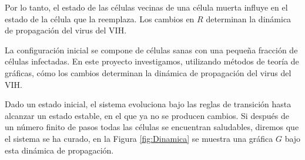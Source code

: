 \documentclass[12pt,titlepage,twoside,openright]{book}
\begin{document}
Por lo tanto, el estado de las c\'elulas vecinas de una c\'elula muerta influye en el estado de la c\'elula que la reemplaza. Los cambios en $R$ determinan la din\'amica de propagaci\'on del virus del VIH.

La configuraci\'on inicial se compone de c\'elulas sanas con una peque\~na fracci\'on de c\'elulas infectadas. En este proyecto investigamos, utilizando m\'etodos de teor\'ia de gr\'aficas, c\'omo los cambios determinan la din\'amica de propagaci\'on del virus del VIH.

Dado un estado inicial, el sistema evoluciona bajo las reglas de transici\'on hasta alcanzar un estado estable, en el que ya no se producen cambios. Si despu\'es de un n\'umero finito de pasos todas las c\'elulas se encuentran saludables, diremos que el sistema se ha curado, en la Figura \ref{fig:Dinamica} se muestra una gr\'afica $G$ bajo esta din\'amica de propagaci\'on.
\end{document}

